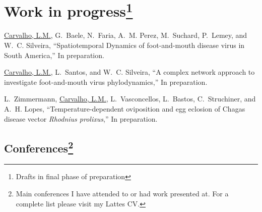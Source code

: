 \documentclass[10pt]{article}
\begin{document}
\section*{Work in progress\footnote{Drafts in final phase of preparation}}

\underline{Carvalho, L.M.}, G.~Baele, N.~Faria, A.~M. Perez, M.~Suchard, P.~Lemey, and  W.~C. Silveira, ``{S}patiotemporal {D}ynamics of foot-and-mouth disease virus in {S}outh {A}merica,'' In preparation.

\underline{Carvalho, L.M.}, L.~Santos, and W.~C. Silveira, ``A complex network approach to investigate foot-and-mouth virus phylodynamics,'' In preparation.

L.~Zimmermann, \underline{Carvalho, L.M.}, L.~Vasconcellos, L.~Bastos, C.~Struchiner, and A.~H. Lopes, ``{T}emperature-dependent oviposition and egg eclosion of {C}hagas disease vector \textit{{R}hodnius prolixus},'' In preparation.
\subsection*{Conferences\footnote{Main conferences I have attended to or had work presented at. For a complete list please visit my Lattes CV.}}
\end{document}
